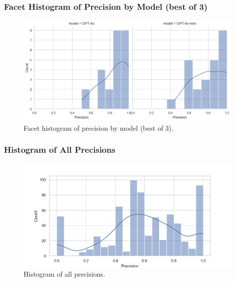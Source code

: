            \subsubsection{Facet Histogram of Precision by Model (best of 3)}
            \begin{figure}[H]
                \centering
                \includegraphics[width=\textwidth]{images_exp2/precision/facet_hist_precision_by_model_best_precision.png}
                \caption{Facet histogram of precision by model (best of 3).}
                \label{fig:facet_hist_precision_by_model_best_precision}
            \end{figure}


            \subsubsection{Histogram of All Precisions}
            \begin{figure}[H]
                \centering
                \includegraphics[scale=0.75]{images_exp2/precision/hist_precision_all.png}
                \caption{Histogram of all precisions.}
                \label{fig:hist_precision_all}
            \end{figure}


